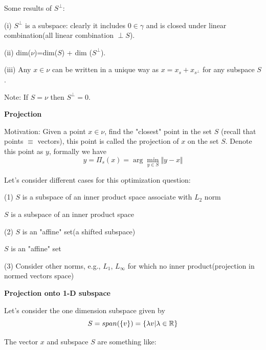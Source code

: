 Some results of $S^{\perp}$:

(i) $S^{\perp}$ is a subspace: clearly it includes $0\in\gamma$ and is closed under linear combination(all linear combination $\perp S$).

(ii) dim($\nu$)=dim($S$) + dim ($S^{\perp}$).

(iii) Any $x\in\nu$ can be written in a unique way as $x=x_{s}+x_{s^{\perp}}$ for any subspace $S$.

Note: If $S=\nu$ then $S^{\perp}={0}$.


\vspace{0.5cm}
\noindent\textbf{Projection}

Motivation: Given a point $x\in\nu$, find the "closest" point in the set $S$ (recall that points $\equiv$ vectors), this point is called the projection of $x$ on the set $S$. Denote this point as $y$, formally we have
$$y=\Pi_{s}(x)=\arg \min_{y\in S} \Vert y-x\Vert$$

\vspace{0.3cm}
Let's consider different cases for this optimization question:

(1) $S$ is a subspace of an inner product space associate with $L_{2}$ norm

\begin{marginfigure}
	\centering
	\resizebox{7.5cm}{3cm}{}
	\caption{$S$ is a subspace of an inner product space}
	\label{}
\end{marginfigure}

(2) $S$ is an "affine" set(a shifted subspace)

\begin{marginfigure}
	\centering
	\resizebox{7.5cm}{3cm}{}
	\caption{$S$ is an "affine" set}
	\label{}
\end{marginfigure}

(3) Consider other norms, e.g., $L_{1}$, $L_{\infty}$ for which no inner product(projection in normed vectors space)

\vspace{0.3cm}
\textbf{Projection onto 1-D subspace}

Let's consider the one dimension subspace given by
$$S=span(\{v\})=\{\lambda v|\lambda \in \mathbb{R}\}$$

The vector $x$ and subspace $S$ are something like:
\begin{figure}
	\centering
	\resizebox{7.5cm}{3cm}{}
	\caption{}
	\label{}
\end{figure}

